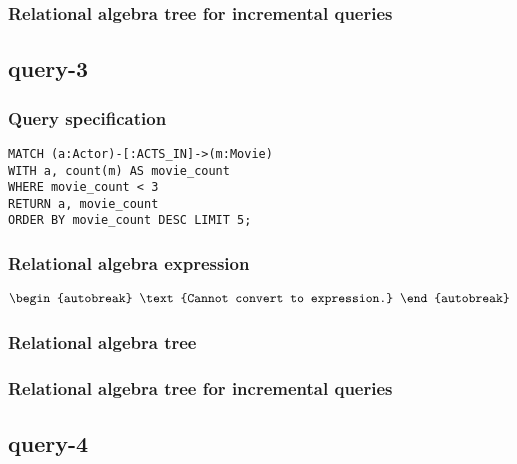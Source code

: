 
\subsubsection*{Relational algebra tree for incremental queries}

\subsection{query-3}

\subsubsection*{Query specification}

\begin{lstlisting}
MATCH (a:Actor)-[:ACTS_IN]->(m:Movie)
WITH a, count(m) AS movie_count
WHERE movie_count < 3
RETURN a, movie_count
ORDER BY movie_count DESC LIMIT 5;
\end{lstlisting}

\subsubsection*{Relational algebra expression}

\begin{align*}
\begin{autobreak}
\text{Cannot convert to expression.}
\end{autobreak}
\end{align*}

\subsubsection*{Relational algebra tree}


\subsubsection*{Relational algebra tree for incremental queries}

\subsection{query-4}

